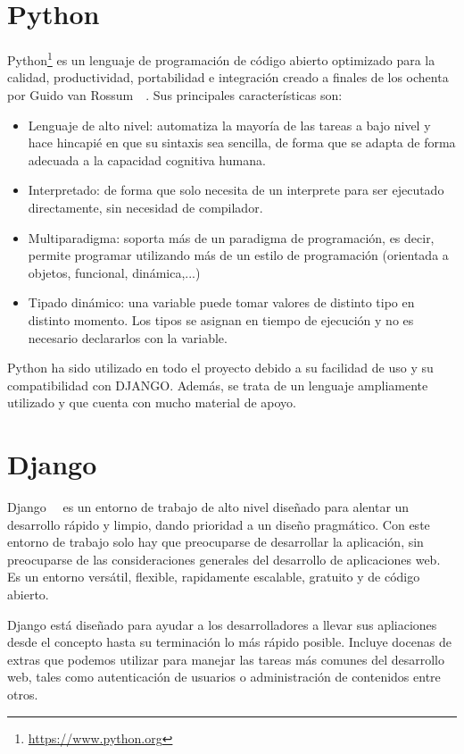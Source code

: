 \documentclass[a4paper, 12pt]{book}
\begin{document}
\section{Python} 
\label{sec:seccion2}
Python\footnote{\url{https://www.python.org}} es un lenguaje de programación de código abierto optimizado para la calidad, productividad, portabilidad e integración creado a finales de los ochenta por Guido van Rossum~\cite{lutz:_programming_python}~\cite{beazley:_essential_reference}. Sus principales características son:

\begin{itemize}
  \item Lenguaje de alto nivel: automatiza la mayoría de las tareas a bajo nivel y hace hincapié en que su sintaxis sea sencilla, de forma que se adapta de forma adecuada a la capacidad cognitiva humana.
  \item Interpretado: de forma que solo necesita de un interprete para ser ejecutado directamente, sin necesidad de compilador.
  \item Multiparadigma: soporta más de un paradigma de programación, es decir, permite programar utilizando más de un estilo de programación (orientada a objetos, funcional, dinámica,...)
  \item Tipado dinámico: una variable puede tomar valores de distinto tipo en distinto momento. Los tipos se asignan en tiempo de ejecución y no es necesario declararlos con la variable.
\end{itemize}

Python ha sido utilizado en todo el proyecto debido a su facilidad de uso y su compatibilidad con DJANGO. Además, se trata de un lenguaje ampliamente utilizado y que cuenta con mucho material de apoyo.

\section{Django} 
\label{sec:seccion3}
Django~\cite{django:_django}~\cite{bennet:_django} es un entorno de trabajo de alto nivel diseñado para alentar un desarrollo rápido y limpio, dando prioridad a un diseño pragmático. Con este entorno de trabajo solo hay que preocuparse de desarrollar la aplicación, sin preocuparse de las consideraciones generales del desarrollo de aplicaciones web. Es un entorno versátil, flexible, rapidamente escalable, gratuito y de código abierto.

Django está diseñado para ayudar a los desarrolladores a llevar sus apliaciones desde el concepto hasta su terminación lo más rápido posible. Incluye docenas de extras que podemos utilizar para manejar las tareas más comunes del desarrollo web, tales como autenticación de usuarios o administración de contenidos entre otros.
\end{document}

